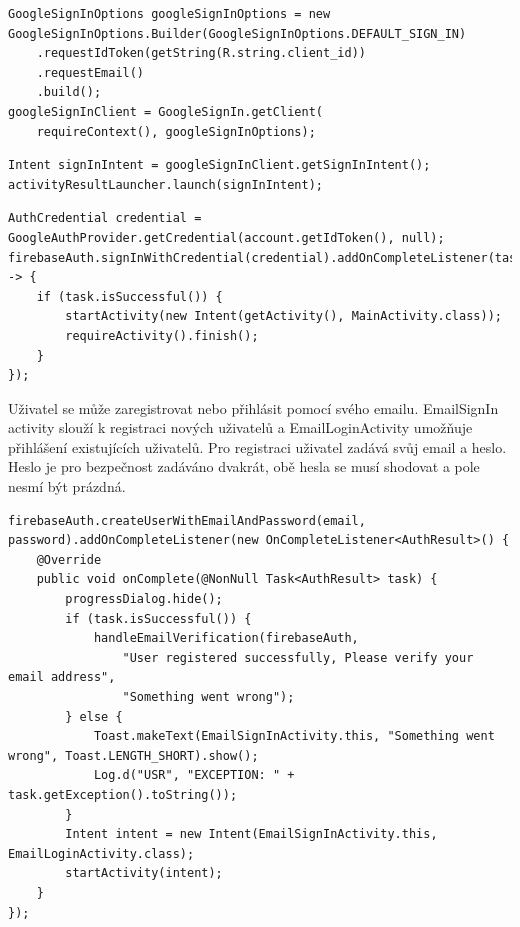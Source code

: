 \begin{lstlisting}[style=javastyle,caption = {googleSignInOptions},label = {lst:googleSignInOptions}]
GoogleSignInOptions googleSignInOptions = new GoogleSignInOptions.Builder(GoogleSignInOptions.DEFAULT_SIGN_IN)
    .requestIdToken(getString(R.string.client_id))
    .requestEmail()
    .build();
googleSignInClient = GoogleSignIn.getClient(
    requireContext(), googleSignInOptions);
\end{lstlisting}        

\begin{lstlisting}[style=javastyle,caption = {signInIntent},label = {lst:signInIntent}]
Intent signInIntent = googleSignInClient.getSignInIntent();
activityResultLauncher.launch(signInIntent);
\end{lstlisting}          

\begin{lstlisting}[style=javastyle,caption = {GoogleAuthProvider},label = {lst:GoogleAuthProvider}]
AuthCredential credential = GoogleAuthProvider.getCredential(account.getIdToken(), null);
firebaseAuth.signInWithCredential(credential).addOnCompleteListener(task -> {
    if (task.isSuccessful()) {
        startActivity(new Intent(getActivity(), MainActivity.class));
        requireActivity().finish();
    }
});
\end{lstlisting} 

\newpage

Uživatel se může zaregistrovat nebo přihlásit pomocí svého emailu. EmailSignIn activity  slouží k registraci nových uživatelů a EmailLoginActivity  umožňuje přihlášení existujících uživatelů. Pro registraci uživatel zadává svůj email a heslo. Heslo je pro bezpečnost zadáváno dvakrát, obě hesla se musí shodovat a pole nesmí být prázdná.

\begin{lstlisting}[style=javastyle,caption = {Create New User},label = {lst:CreateNewUser}]
firebaseAuth.createUserWithEmailAndPassword(email, password).addOnCompleteListener(new OnCompleteListener<AuthResult>() {
    @Override
    public void onComplete(@NonNull Task<AuthResult> task) {
        progressDialog.hide();
        if (task.isSuccessful()) {
            handleEmailVerification(firebaseAuth, 
                "User registered successfully, Please verify your email address", 
                "Something went wrong");
        } else {
            Toast.makeText(EmailSignInActivity.this, "Something went wrong", Toast.LENGTH_SHORT).show();
            Log.d("USR", "EXCEPTION: " + task.getException().toString());
        }
        Intent intent = new Intent(EmailSignInActivity.this, EmailLoginActivity.class);
        startActivity(intent);
    }
});
\end{lstlisting} 

